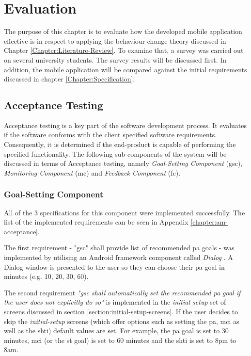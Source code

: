 \chapter{Evaluation}
The purpose of this chapter is to evaluate how the developed mobile application effective is in respect to applying the behaviour change theory discussed in Chapter \ref{Chapter:Literature-Review}. To examine that, a survey was carried out on several university students. The survey results will be discussed first. In addition, the mobile application will be compared against the initial requirements discussed in chapter  \ref{Chapter:Specification}.

\section{Acceptance Testing}
Acceptance testing is a key part of the software development process. It evaluates if the software conforms with the client specified software requirements. Consequently, it is determined if the end-product is capable of performing the specified functionality. The following sub-components of the system will be discussed in terms of Acceptance testing, namely \textit{Goal-Setting Component} (\gls{gsc}), \textit{Monitoring Component} (\gls{mc}) and \textit{Feedback Component} (\gls{fc}).

\subsection{Goal-Setting Component}
All of the 3 specifications for this component were implemented successfully. The list of the implemented requirements can be seen in Appendix \ref{chapter:am-acceptance}.

The first requirement - "\gls{gsc}" shall provide list of recommended \gls{pa} goals - was implemented by utilising an Android framework component called \textit{Dialog} \citep{androiddialogs_2017}. A Dialog window is presented to the user so they can choose their \gls{pa} goal in minutes (e.g. 10, 20, 30, 60).

The second requirement \textit{"\gls{gsc} shall automatically set the recommended \gls{pa} goal if the user does not explicitly do so"} is implemented in the \textit{initial setup} set of screens discussed in section \ref{section:initial-setup-screens}. If the user decides to skip the \textit{initial-setup} screens (which offer options such as setting the \gls{pa}, \gls{mci} as well as the \gls{shti}) default values are set. For example, the \gls{pa} goal is set to 30 minutes, \gls{mci} (or the \gls{st} goal) is set to 60 minutes and the \gls{shti} is set to 8pm to 8am.

